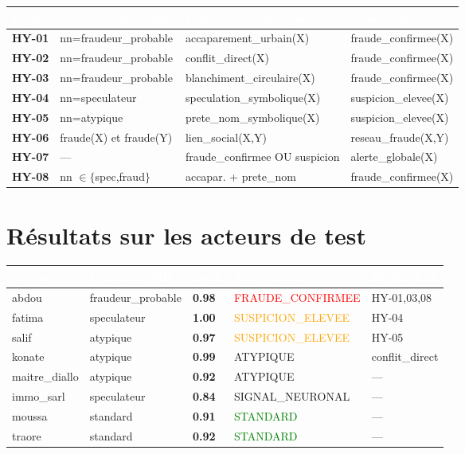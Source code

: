 \documentclass[11pt,a4paper]{report}
\begin{document}
\begin{longtable}{>{\bfseries}p{1.3cm} p{3.5cm} p{4.5cm} p{4.5cm}}
\toprule
\rowcolor{tablehead}\textcolor{white}{Règle} & \textcolor{white}{Condition neuronale} & \textcolor{white}{Condition symbolique} & \textcolor{white}{Conclusion} \\
\midrule
\endhead
HY-01 & nn=fraudeur\_probable & accaparement\_urbain(X) & fraude\_confirmee(X) \\
HY-02 & nn=fraudeur\_probable & conflit\_direct(X) & fraude\_confirmee(X) \\
HY-03 & nn=fraudeur\_probable & blanchiment\_circulaire(X) & fraude\_confirmee(X) \\
HY-04 & nn=speculateur & speculation\_symbolique(X) & suspicion\_elevee(X) \\
HY-05 & nn=atypique & prete\_nom\_symbolique(X) & suspicion\_elevee(X) \\
HY-06 & fraude(X) et fraude(Y) & lien\_social(X,Y) & reseau\_fraude(X,Y) \\
HY-07 & --- & fraude\_confirmee OU suspicion & alerte\_globale(X) \\
HY-08 & nn $\in\{$spec,fraud$\}$ & accapar. + prete\_nom & fraude\_confirmee(X) \\
\bottomrule
\end{longtable}

\section{Résultats sur les acteurs de test}

\begin{center}
\begin{tabular}{>{\ttfamily}p{2.5cm} p{3cm} >{\bfseries}p{1.5cm} p{3cm} p{3cm}}
\toprule
\rowcolor{tablehead}\textcolor{white}{Acteur} & \textcolor{white}{Prédiction NN} & \textcolor{white}{Conf.} & \textcolor{white}{Alerte finale} & \textcolor{white}{Règles XAI} \\
\midrule
abdou         & fraudeur\_probable & 0.98 & \textcolor{red}{FRAUDE\_CONFIRMEE} & HY-01,03,08 \\
fatima        & speculateur        & 1.00 & \textcolor{orange}{SUSPICION\_ELEVEE} & HY-04 \\
salif         & atypique           & 0.97 & \textcolor{orange}{SUSPICION\_ELEVEE} & HY-05 \\
konate        & atypique           & 0.99 & ATYPIQUE & conflit\_direct \\
maitre\_diallo& atypique           & 0.92 & ATYPIQUE & --- \\
immo\_sarl    & speculateur        & 0.84 & SIGNAL\_NEURONAL & --- \\
moussa        & standard           & 0.91 & \textcolor{green}{STANDARD} & --- \\
traore        & standard           & 0.92 & \textcolor{green}{STANDARD} & --- \\
\bottomrule
\end{tabular}
\end{center}
\end{document}
